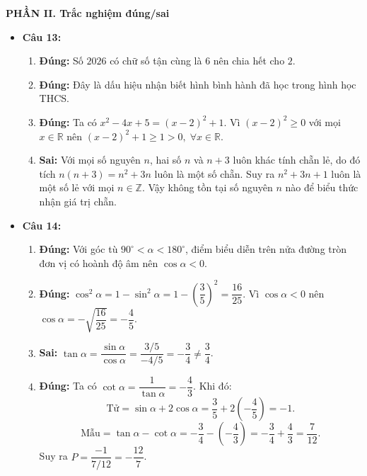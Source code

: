 \documentclass[12pt,a4paper]{article}
\begin{document}
\vspace{0.2cm}
\textbf{PHẦN II. Trắc nghiệm đúng/sai}
\begin{itemize}[leftmargin=0.6cm, itemsep=3pt]
    \item \textbf{Câu 13:}
    \begin{enumerate}
        \item \textbf{Đúng:} Số $2026$ có chữ số tận cùng là $6$ nên chia hết cho $2$.
        \item \textbf{Đúng:} Đây là dấu hiệu nhận biết hình bình hành đã học trong hình học THCS.
        \item \textbf{Đúng:} Ta có $x^2 - 4x + 5 = (x - 2)^2 + 1$. Vì $(x - 2)^2 \ge 0$ với mọi $x \in \mathbb{R}$ nên $(x - 2)^2 + 1 \ge 1 > 0,\; \forall x \in \mathbb{R}$.
        \item \textbf{Sai:} Với mọi số nguyên $n$, hai số $n$ và $n + 3$ luôn khác tính chẵn lẻ, do đó tích $n(n + 3) = n^2 + 3n$ luôn là một số chẵn. Suy ra $n^2 + 3n + 1$ luôn là một số lẻ với mọi $n \in \mathbb{Z}$. Vậy không tồn tại số nguyên $n$ nào để biểu thức nhận giá trị chẵn.
    \end{enumerate}

    \item \textbf{Câu 14:}
    \begin{enumerate}
        \item \textbf{Đúng:} Với góc tù $90^\circ < \alpha < 180^\circ$, điểm biểu diễn trên nửa đường tròn đơn vị có hoành độ âm nên $\cos \alpha < 0$.
        \item \textbf{Đúng:} $\cos^2 \alpha = 1 - \sin^2 \alpha = 1 - \left(\dfrac{3}{5}\right)^2 = \dfrac{16}{25}$. Vì $\cos \alpha < 0$ nên $\cos \alpha = -\sqrt{\dfrac{16}{25}} = -\dfrac{4}{5}$.
        \item \textbf{Sai:} $\tan \alpha = \dfrac{\sin \alpha}{\cos \alpha} = \dfrac{3/5}{-4/5} = -\dfrac{3}{4} \ne \dfrac{3}{4}$.
        \item \textbf{Đúng:} Ta có $\cot \alpha = \dfrac{1}{\tan \alpha} = -\dfrac{4}{3}$. Khi đó:
        \[
        \text{Tử} = \sin \alpha + 2\cos \alpha = \dfrac{3}{5} + 2\left(-\dfrac{4}{5}\right) = -1.
        \]
        \[
        \text{Mẫu} = \tan \alpha - \cot \alpha = -\dfrac{3}{4} - \left(-\dfrac{4}{3}\right) = -\dfrac{3}{4} + \dfrac{4}{3} = \dfrac{7}{12}.
        \]
        Suy ra $P = \dfrac{-1}{7/12} = -\dfrac{12}{7}$.
    \end{enumerate}
\end{itemize}
\end{document}
